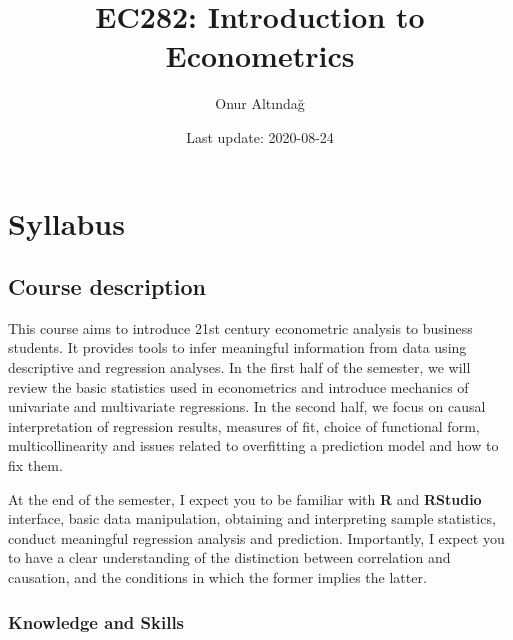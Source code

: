 \documentclass[
]{book}
\title{EC282: Introduction to Econometrics}
\author{Onur Altındağ}
\date{Last update: 2020-08-24}
\begin{document}
\maketitle

{
\setcounter{tocdepth}{1}
\tableofcontents
}
\hypertarget{syllabus}{%
\chapter*{Syllabus}\label{syllabus}}

\hypertarget{course-desctiption}{%
\section*{Course description}\label{course-desctiption}}

This course aims to introduce 21st century econometric analysis to business students. It provides tools to infer meaningful information from data using descriptive and regression analyses. In the first half of the semester, we will review the basic statistics used in econometrics and introduce mechanics of univariate and multivariate regressions. In the second half, we focus on causal interpretation of regression results, measures of fit, choice of functional form, multicollinearity and issues related to overfitting a prediction model and how to fix them.

At the end of the semester, I expect you to be familiar with \textbf{R} and \textbf{RStudio} interface, basic data manipulation, obtaining and interpreting sample statistics, conduct meaningful regression analysis and prediction. Importantly, I expect you to have a clear understanding of the distinction between correlation and causation, and the conditions in which the former implies the latter.

\hypertarget{knowledge}{%
\subsection*{Knowledge and Skills}\label{knowledge}}
\end{document}
